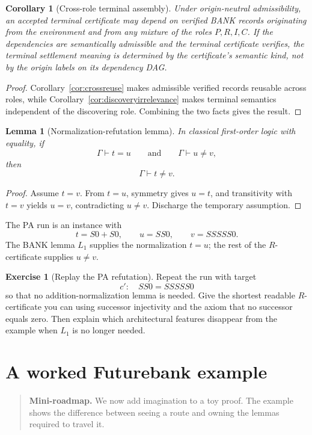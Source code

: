 \documentclass[11pt,openany]{book}
\newtheorem{corollary}[theorem]{Corollary}
\newtheorem{lemma}[theorem]{Lemma}
\theoremstyle{definition}
\newtheorem{exercise}[theorem]{Exercise}
\theoremstyle{remark}
\newenvironment{miniroadmap}{\begin{quote}\small\color{deepblue}\textbf{Mini-roadmap.} }{\end{quote}}
\begin{document}
\begin{corollary}[Cross-role terminal assembly]\label{cor:crossroleassembly}
Under origin-neutral admissibility, an accepted terminal certificate may depend on verified BANK records originating from the environment and from any mixture of the roles $P,R,I,C$. If the dependencies are semantically admissible and the terminal certificate verifies, the terminal settlement meaning is determined by the certificate's semantic kind, not by the origin labels on its dependency DAG.
\end{corollary}
\begin{proof}
Corollary~\ref{cor:crossreuse} makes admissible verified records reusable across roles, while Corollary~\ref{cor:discoveryirrelevance} makes terminal semantics independent of the discovering role. Combining the two facts gives the result.
\end{proof}

\begin{lemma}[Normalization-refutation lemma]\label{lem:normrefute}
In classical first-order logic with equality, if
\[
\Gamma\vdash t=u
\qquad\text{and}\qquad
\Gamma\vdash u\neq v,
\]
then
\[
\Gamma\vdash t\neq v.
\]
\end{lemma}
\begin{proof}
Assume $t=v$. From $t=u$, symmetry gives $u=t$, and transitivity with $t=v$ yields $u=v$, contradicting $u\neq v$. Discharge the temporary assumption.
\end{proof}

The PA run is an instance with
\[
t=S0+S0,\qquad u=SS0,\qquad v=SSSSS0.
\]
The BANK lemma $L_1$ supplies the normalization $t=u$; the rest of the $R$-certificate supplies $u\neq v$.

\begin{exercise}[Replay the PA refutation]\label{ex:pa115}
Repeat the run with target
\[
c':\quad SS0=SSSSS0
\]
so that no addition-normalization lemma is needed. Give the shortest readable $R$-certificate you can using successor injectivity and the axiom that no successor equals zero. Then explain which architectural features disappear from the example when $L_1$ is no longer needed.
\end{exercise}


\chapter{A worked Futurebank example}
\begin{miniroadmap}
We now add imagination to a toy proof. The example shows the difference between seeing a route and owning the lemmas required to travel it.
\end{miniroadmap}
\end{document}
